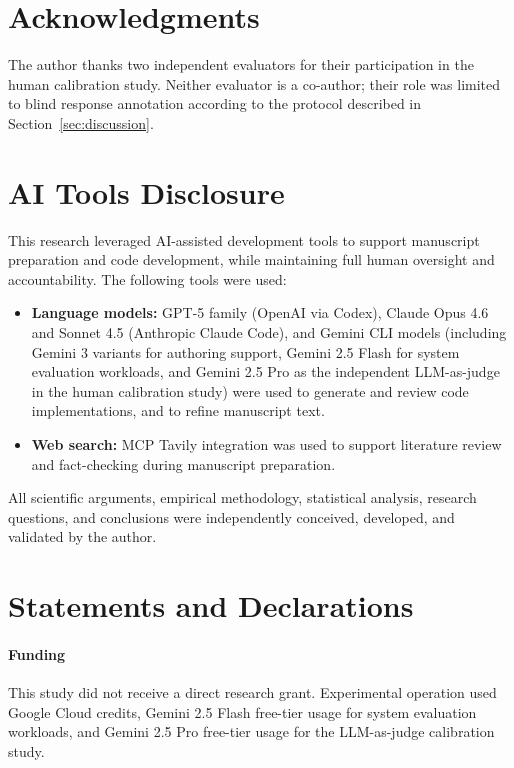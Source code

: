 \documentclass[twocolumn]{article}
\begin{document}








\section*{Acknowledgments}
The author thanks two independent evaluators for their participation in the human calibration study. Neither evaluator is a co-author; their role was limited to blind response annotation according to the protocol described in Section~\ref{sec:discussion}.

\section*{AI Tools Disclosure}

This research leveraged AI-assisted development tools to support manuscript preparation and code development, while maintaining full human oversight and accountability. The following tools were used:
\begin{itemize}
    \item \textbf{Language models:} GPT-5 family (OpenAI via Codex),
    Claude Opus 4.6 and Sonnet 4.5 (Anthropic Claude Code), and
    Gemini CLI models (including Gemini 3 variants for authoring support,
    Gemini 2.5 Flash for system evaluation workloads, and
    Gemini 2.5 Pro as the independent LLM-as-judge in the human calibration study)
    were used to generate and review code implementations, and to refine manuscript text.

    \item \textbf{Web search:} MCP Tavily integration was used to support literature review and fact-checking during manuscript preparation.
\end{itemize}

All scientific arguments, empirical methodology, statistical analysis, research questions, and conclusions were independently conceived, developed, and validated by the author.

\section*{Statements and Declarations}
\paragraph{Funding}
This study did not receive a direct research grant. Experimental operation used Google Cloud credits, Gemini 2.5 Flash free-tier usage for system evaluation workloads, and Gemini 2.5 Pro free-tier usage for the LLM-as-judge calibration study.
\end{document}
